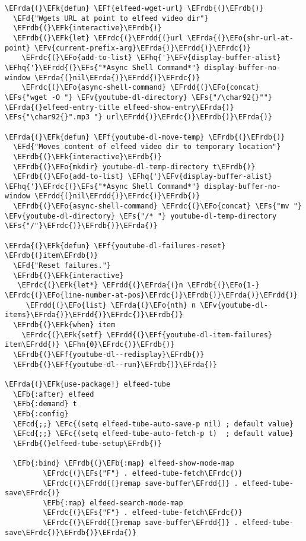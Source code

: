 \documentclass[a4wide,10pt]{article}
\newcommand{\EFc}[1]{\textcolor{EFc}{#1}} %
\newcommand{\EFcd}[1]{\textcolor{EFcd}{#1}} %
\newcommand{\EFs}[1]{\textcolor{EFs}{#1}} %
\newcommand{\EFd}[1]{\textcolor{EFd}{#1}} %
\newcommand{\EFk}[1]{\textcolor{EFk}{#1}} %
\newcommand{\EFb}[1]{\textcolor{EFb}{#1}} %
\newcommand{\EFf}[1]{\textcolor{EFf}{#1}} %
\newcommand{\EFv}[1]{\textcolor{EFv}{#1}} %
\newcommand{\EFo}[1]{\textcolor{EFo}{#1}} %
\newcommand{\EFhn}[1]{\textcolor{EFhn}{\textbf{#1}}} %
\newcommand{\EFhq}[1]{\textcolor{EFhq}{#1}} %
\newcommand{\EFrda}[1]{\textcolor{EFrda}{#1}} %
\newcommand{\EFrdb}[1]{\textcolor{EFrdb}{#1}} %
\newcommand{\EFrdc}[1]{\textcolor{EFrdc}{#1}} %
\newcommand{\EFrdd}[1]{\textcolor{EFrdd}{#1}} %
\begin{document}
\begin{Code}
\begin{Verbatim}
\EFrda{(}\EFk{defun} \EFf{elfeed-wget-url} \EFrdb{(}\EFrdb{)}
  \EFd{"Wgets URL at point to elfeed video dir"}
  \EFrdb{(}\EFk{interactive}\EFrdb{)}
  \EFrdb{(}\EFk{let} \EFrdc{(}\EFrdd{(}url \EFrda{(}\EFo{shr-url-at-point} \EFv{current-prefix-arg}\EFrda{)}\EFrdd{)}\EFrdc{)}
    \EFrdc{(}\EFo{add-to-list} \EFhq{'}\EFv{display-buffer-alist} \EFhq{'}\EFrdd{(}\EFs{"*Async Shell Command*"} display-buffer-no-window \EFrda{(}nil\EFrda{)}\EFrdd{)}\EFrdc{)}
    \EFrdc{(}\EFo{async-shell-command} \EFrdd{(}\EFo{concat} \EFs{"wget -O "} \EFv{youtube-dl-directory} \EFs{"/\char92{}""} \EFrda{(}elfeed-entry-title elfeed-show-entry\EFrda{)} \EFs{"\char92{}".mp3 "} url\EFrdd{)}\EFrdc{)}\EFrdb{)}\EFrda{)}

\EFrda{(}\EFk{defun} \EFf{youtube-dl-move-temp} \EFrdb{(}\EFrdb{)}
  \EFd{"Moves content of elfeed video dir to temporary location"}
  \EFrdb{(}\EFk{interactive}\EFrdb{)}
  \EFrdb{(}\EFo{mkdir} youtube-dl-temp-directory t\EFrdb{)}
  \EFrdb{(}\EFo{add-to-list} \EFhq{'}\EFv{display-buffer-alist} \EFhq{'}\EFrdc{(}\EFs{"*Async Shell Command*"} display-buffer-no-window \EFrdd{(}nil\EFrdd{)}\EFrdc{)}\EFrdb{)}
  \EFrdb{(}\EFo{async-shell-command} \EFrdc{(}\EFo{concat} \EFs{"mv "} \EFv{youtube-dl-directory} \EFs{"/* "} youtube-dl-temp-directory \EFs{"/"}\EFrdc{)}\EFrdb{)}\EFrda{)}

\EFrda{(}\EFk{defun} \EFf{youtube-dl-failures-reset} \EFrdb{(}item\EFrdb{)}
  \EFd{"Reset failures."}
  \EFrdb{(}\EFk{interactive}
   \EFrdc{(}\EFk{let*} \EFrdd{(}\EFrda{(}n \EFrdb{(}\EFo{1-} \EFrdc{(}\EFo{line-number-at-pos}\EFrdc{)}\EFrdb{)}\EFrda{)}\EFrdd{)}
     \EFrdd{(}\EFo{list} \EFrda{(}\EFo{nth} n \EFv{youtube-dl-items}\EFrda{)}\EFrdd{)}\EFrdc{)}\EFrdb{)}
  \EFrdb{(}\EFk{when} item
    \EFrdc{(}\EFk{setf} \EFrdd{(}\EFf{youtube-dl-item-failures} item\EFrdd{)} \EFhn{0}\EFrdc{)}\EFrdb{)}
  \EFrdb{(}\EFf{youtube-dl--redisplay}\EFrdb{)}
  \EFrdb{(}\EFf{youtube-dl--run}\EFrdb{)}\EFrda{)}

\EFrda{(}\EFk{use-package!} elfeed-tube
  \EFb{:after} elfeed
  \EFb{:demand} t
  \EFb{:config}
  \EFcd{;;} \EFc{(setq elfeed-tube-auto-save-p nil) ; default value}
  \EFcd{;;} \EFc{(setq elfeed-tube-auto-fetch-p t)  ; default value}
  \EFrdb{(}elfeed-tube-setup\EFrdb{)}

  \EFb{:bind} \EFrdb{(}\EFb{:map} elfeed-show-mode-map
         \EFrdc{(}\EFs{"F"} . elfeed-tube-fetch\EFrdc{)}
         \EFrdc{(}\EFrdd{[}remap save-buffer\EFrdd{]} . elfeed-tube-save\EFrdc{)}
         \EFb{:map} elfeed-search-mode-map
         \EFrdc{(}\EFs{"F"} . elfeed-tube-fetch\EFrdc{)}
         \EFrdc{(}\EFrdd{[}remap save-buffer\EFrdd{]} . elfeed-tube-save\EFrdc{)}\EFrdb{)}\EFrda{)}


\end{Verbatim}
\end{Code}
\end{document}

